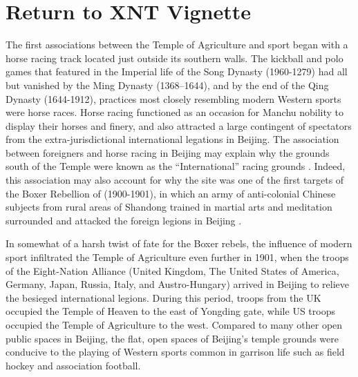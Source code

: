 \section{Return to XNT Vignette}
The first associations between the Temple of Agriculture and sport began with a horse racing track located just outside its southern walls.  The kickball and polo games that featured in the Imperial life of the Song Dynasty (1960-1279) had all but vanished by the Ming Dynasty (1368–1644), and by the end of the Qing Dynasty (1644-1912), practices most closely resembling modern Western sports were horse races.  Horse racing functioned as an occasion for Manchu nobility to display their horses and finery, and also attracted a large contingent of spectators from the extra-jurisdictional international legations in Beijing.  The association between foreigners and horse racing in Beijing may explain why the grounds south of the Temple were known as the ``International'' racing grounds \citep{Brownell2008}. Indeed, this association may also account for why the site was one of the first targets of the Boxer Rebellion of (1900-1901), in which an army of anti-colonial Chinese subjects from rural areas of Shandong trained in martial arts and meditation surrounded and attacked the foreign legions in Beijing \citep{Brownell2008}.

In somewhat of a harsh twist of fate for the Boxer rebels, the influence of modern sport infiltrated the Temple of Agriculture even further in 1901, when the troops of the Eight-Nation Alliance (United Kingdom, The United States of America, Germany, Japan, Russia, Italy, and Austro-Hungary) arrived in Beijing to relieve the besieged international legions.  During this period, troops from the UK occupied the Temple of Heaven to the east of Yongding gate, while US troops occupied the Temple of Agriculture to the west. Compared to many other open public spaces in Beijing, the flat, open spaces of Beijing's temple grounds were conducive to the playing of Western sports common in garrison life such as field hockey and association football.

